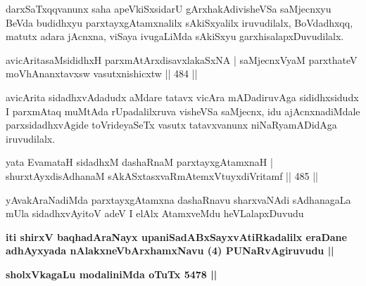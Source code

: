 \begin{artha}
darxSaTxqqvanunx saha apeVkiSxsidarU gArxhakAdivisheVSa saMjecnxyu BeVda budidhxyu parxtayxgAtamxnalilx sAkiSxyalilx iruvudilalx, BoVdadhxqq, matutx adara jAcnxna, viSaya ivugaLiMda sAkiSxyu garxhisalapxDuvudilalx.
\end{artha}


\begin{shl}
avicAritasaMsididhxH parxmAtArxdisavxlakaSxNA |
saMjecnxVyaM parxthateV moVhAnanxtavxsw vasutxnishicxtw \hfill  || 484 ||
\end{shl}

\begin{artha}
avicArita sidadhxvAdadudx aMdare tatavx vicAra mADadiruvAga sididhxsidudx I parxmAtaq muMtAda rUpadalilxruva visheVSa saMjecnx, idu ajAcnxnadiMdale parxsidadhxvAgide toVrideyaSeTx vasutx tatavxvanunx niNaRyamADidAga iruvudilalx.
\end{artha}

\begin{shl}
yata EvamataH sidadhxM dashaRnaM parxtayxgAtamxnaH |
shurxtAyxdisAdhanaM sAkASxtasxvaRmAtemxVtuyxdiVritamf \hfill  || 485 ||
\end{shl}

\begin{artha}
yAvakAraNadiMda parxtayxgAtamxna dashaRnavu sharxvaNAdi sAdhanagaLa mUla
sidadhxvAyitoV adeV I elAlx AtamxveMdu heVLalapxDuvudu 
\end{artha}

\begin{center}
\textbf{iti shirxV baqhadAraNayx upaniSadABxSayxvAtiRkadalilx eraDane
adhAyxyada nAlakxneVbArxhamxNavu (4) PUNaRvAgiruvudu ||}

\textbf{sholxVkagaLu modaliniMda oTuTx 5478 ||}
\end{center}
